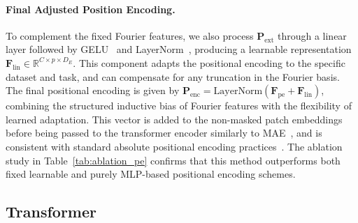 \documentclass{article}
\begin{document}
\paragraph{Final Adjusted Position Encoding.}
To complement the fixed Fourier features, we also process $\mathbf{P}_{\text{ext}}$ through a linear layer followed by GELU~\citep{hendrycks2016gaussian} and LayerNorm~\citep{lei2016layernorm}, producing a learnable representation $\mathbf{F}_{\text{lin}} \in \mathbb{R}^{C \times p \times D_E}$. This component adapts the positional encoding to the specific dataset and task, and can compensate for any truncation in the Fourier basis. The final positional encoding is given by $\mathbf{P}_{\text{enc}} = \text{LayerNorm}(\mathbf{F}_{\text{pe}} + \mathbf{F}_{\text{lin}})$, combining the structured inductive bias of Fourier features with the flexibility of learned adaptation. This vector is added to the non-masked patch embeddings before being passed to the transformer encoder similarly to MAE~\citep{he2022masked}, and is consistent with standard absolute positional encoding practices~\citep{vaswani2017attention}. The ablation study in Table~\ref{tab:ablation_pe} confirms that this method outperforms both fixed learnable and purely MLP-based positional encoding schemes.

\subsection{Transformer}
\label{subsec:transfo}


\end{document}
